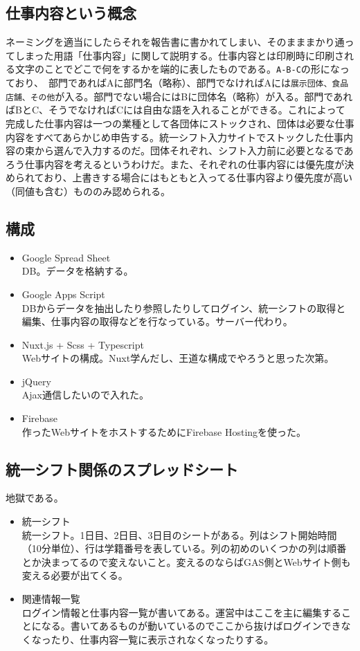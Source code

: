 \documentclass[dvipdfmx,jb5]{jreport}
\begin{document}
\subsection{仕事内容という概念}
ネーミングを適当にしたらそれを報告書に書かれてしまい、そのまままかり通ってしまった用語「仕事内容」に関して説明する。仕事内容とは印刷時に印刷される文字のことでどこで何をするかを端的に表したものである。\verb+A-B-C+の形になっており、　部門であればAに部門名（略称）、部門でなければAには\verb+展示団体、食品店舗、その他+が入る。部門でない場合にはBに団体名（略称）が入る。部門であればBとC、そうでなければCには自由な語を入れることができる。これによって完成した仕事内容は一つの業種として各団体にストックされ、団体は必要な仕事内容をすべてあらかじめ申告する。統一シフト入力サイトでストックした仕事内容の束から選んで入力するのだ。団体それぞれ、シフト入力前に必要となるであろう仕事内容を考えるというわけだ。また、それぞれの仕事内容には優先度が決められており、上書きする場合にはもともと入ってる仕事内容より優先度が高い（同値も含む）もののみ認められる。
\subsection{構成}
\begin{itemize}
      \item Google Spread Sheet\\
            DB。データを格納する。
      \item Google Apps Script\\
            DBからデータを抽出したり参照したりしてログイン、統一シフトの取得と編集、仕事内容の取得などを行なっている。サーバー代わり。
      \item Nuxt.js + Scss + Typescript\\
            Webサイトの構成。Nuxt学んだし、王道な構成でやろうと思った次第。
      \item jQuery\\
            Ajax通信したいので入れた。
      \item Firebase\\
            作ったWebサイトをホストするためにFirebase Hostingを使った。
\end{itemize}
\subsection{統一シフト関係のスプレッドシート}
地獄である。
\begin{itemize}
      \item 統一シフト\\
            統一シフト。1日目、2日目、3日目のシートがある。列はシフト開始時間（10分単位）、行は学籍番号を表している。列の初めのいくつかの列は順番とか決まってるので変えないこと。変えるのならばGAS側とWebサイト側も変える必要が出てくる。
      \item 関連情報一覧\\
            ログイン情報と仕事内容一覧が書いてある。運営中はここを主に編集することになる。書いてあるものが動いているのでここから抜けばログインできなくなったり、仕事内容一覧に表示されなくなったりする。
\end{itemize}
\end{document}
